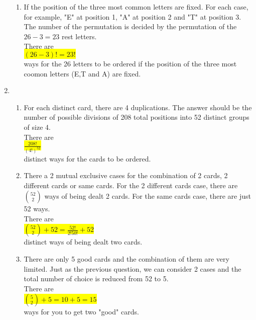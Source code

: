 \documentclass{article}
\begin{document}
\begin{enumerate}
\begin{enumerate}
		\item
		\mysolu
		If the position of the three most common letters are fixed. For each case, for example, "E" at position 1, "A" at position 2 and "T" at position 3. The number of the permutation is decided by the permutation of the ${26 - 3 = 23}$ rest letters.\\
		\myansw
		There are\\
		\colorbox{yellow}{
			${(26-3)! = 23!}$
		}\\
		ways for the 26 letters to be ordered if the position of the three most coomon letters (E,T and A) are fixed.\\
		
		
	\end{enumerate}

	\item
	\begin{enumerate}
		\item
		\mysolu
		For each distinct card, there are 4 duplications. The answer should be the number of possible divisions of 208 total positions into 52 distinct groups of size 4.\\
		\myansw
		There are\\
		\colorbox{yellow}{
			${\frac{208!}{(4!)^{52}}}$
		}\\
		distinct ways for the cards to be ordered.\\
		
		\item
		\mysolu
		There a 2 mutual exclusive cases for the combination of 2 cards, 2 different cards or same cards. For the 2 different cards case, there are ${{52 \choose 2}}$ ways of being dealt 2 cards. For the same cards case, there are just 52 ways.\\
		\myansw
		There are\\
		\colorbox{yellow}{
			${{52 \choose 2}+52 = \frac{52!}{2!50!}+52}$
		}\\
		distinct ways of being dealt two cards.
		
		\item
		\mysolu
		There are only 5 good cards and the combination of them are very limited. Just as the previous question, we can consider 2 cases and the total number of choice is reduced from 52 to 5.\\
		\myansw
		There are\\
		\colorbox{yellow}{
			${{5 \choose 2}+5 = 10 + 5 = 15}$
		}\\
		ways for you to get two "good" cards.\\
		

\end{enumerate}
\end{enumerate}
\end{document}
